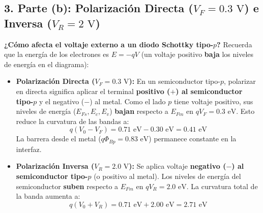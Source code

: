\documentclass[11pt,a4paper]{article}
\begin{document}
\subsection*{3. Parte (b): Polarización Directa ($V_F = 0.3\text{ V}$) e Inversa ($V_R = 2\text{ V}$)}
\textbf{¿Cómo afecta el voltaje externo a un diodo Schottky tipo-$p$?}
Recuerda que la energía de los electrones es $E = -qV$ (un voltaje positivo \textbf{baja} los niveles de energía en el diagrama):
\begin{itemize}
    \item \textbf{Polarización Directa ($V_F = 0.3\text{ V}$):} En un semiconductor tipo-$p$, polarizar en directa significa aplicar el terminal \textbf{positivo ($+$) al semiconductor tipo-$p$} y el negativo ($-$) al metal. Como el lado $p$ tiene voltaje positivo, sus niveles de energía ($E_{Fs}, E_c, E_v$) \textbf{bajan} respecto a $E_{Fm}$ en $qV_F = 0.3\text{ eV}$. Esto reduce la curvatura de las bandas a:
    \[
    q(V_0 - V_F) = 0.71\text{ eV} - 0.30\text{ eV} = 0.41\text{ eV}
    \]
    La barrera desde el metal ($q\Phi_{Bp} = 0.83\text{ eV}$) permanece constante en la interfaz.
    \item \textbf{Polarización Inversa ($V_R = 2.0\text{ V}$):} Se aplica voltaje \textbf{negativo ($-$) al semiconductor tipo-$p$} (o positivo al metal). Los niveles de energía del semiconductor \textbf{suben} respecto a $E_{Fm}$ en $qV_R = 2.0\text{ eV}$. La curvatura total de la banda aumenta a:
    \[
    q(V_0 + V_R) = 0.71\text{ eV} + 2.00\text{ eV} = 2.71\text{ eV}
    \]
\end{itemize}
\end{document}
